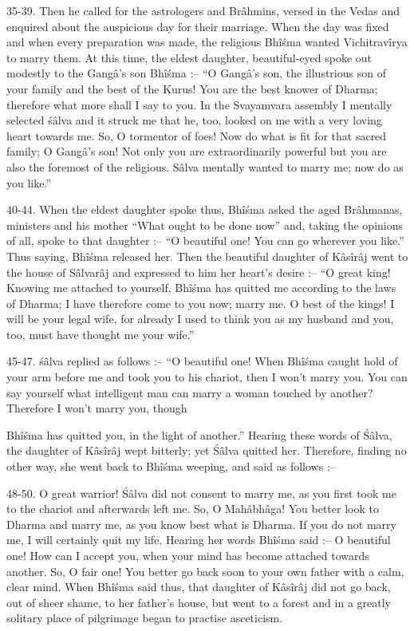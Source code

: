 35-39. Then he called for the astrologers and Br\^ahmins, versed in the Vedas and enquired about the auspicious day for their marriage. When the day was fixed and when every preparation was made, the religious Bh\^i\'sma wanted Vichitrav\^irya to marry them. At this time, the eldest daughter, beautiful-eyed spoke out modestly to the Gang\^a's son Bh\^i\'sma :-- ``O Gang\^a's son, the illustrious son of your family and the best of the Kurus! You are the best knower of Dharma; therefore what more shall I say to you. In the Svayamvara assembly I mentally selected \'s\^alva and it struck me that he, too, looked on me with a very loving heart towards me. So, O tormentor of foes! Now do what is fit for that sacred family; O Gang\^a's son! Not only you are extraordinarily powerful but you are also the foremost of the religious. S\^alva mentally wanted to marry me; now do as you like.''

40-44. When the eldest daughter spoke thus, Bh\^i\'sma asked the aged Br\^ahmanas, ministers and his mother ``What ought to be done now'' and, taking the opinions of all, spoke to that daughter :-- ``O beautiful one! You can go wherever you like.'' Thus saying, Bh\^i\'sma released her. Then the beautiful daughter of K\^as\^ir\^aj went to the house of S\^alvar\^aj and expressed to him her heart's desire :-- ``O great king! Knowing me attached to yourself, Bh\^i\'sma has quitted me according to the laws of Dharma; I have therefore come to you now; marry me. O best of the kings! I will be your legal wife, for already I used to think you as my husband and you, too, must have thought me your wife.''

45-47. \'s\^alva replied as follows :-- ``O beautiful one! When Bh\^i\'sma caught hold of your arm before me and took you to his chariot, then I won't marry you. You can say yourself what intelligent man can marry a woman touched by another? Therefore I won't marry you, though

Bh\^i\'sma has quitted you, in the light of another.'' Hearing these words of \'S\^alva, the daughter of K\^as\^ir\^aj wept bitterly; yet \'S\^alva quitted her. Therefore, finding no other way, she went back to Bh\^i\'sma weeping, and said as follows :--

48-50. O great warrior! \'S\^alva did not consent to marry me, as you first took me to the chariot and afterwards left me. So, O Mah\^abh\^aga! You better look to Dharma and marry me, as you know best what is Dharma. If you do not marry me, I will certainly quit my life. Hearing her words Bh\^i\'sma said :-- O beautiful one! How can I accept you, when your mind has become attached towards another. So, O fair one! You better go back soon to your own father with a calm, clear mind. When Bh\^i\'sma said thus, that daughter of K\^as\^ir\^aj did not go back, out of sheer shame, to her father's house, but went to a forest and in a greatly solitary place of pilgrimage began to practise asceticism.

